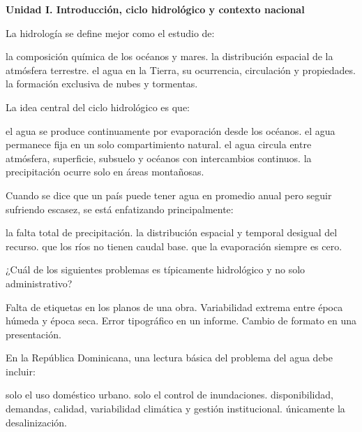 \item[]\textbf{Unidad I. Introducción, ciclo hidrológico y contexto nacional}\par\medskip

\question [2] La hidrología se define mejor como el estudio de:
\begin{choices}
\choice la composición química de los océanos y mares.
\choice la distribución espacial de la atmósfera terrestre.
\CorrectChoice el agua en la Tierra, su ocurrencia, circulación y propiedades.
\choice la formación exclusiva de nubes y tormentas.
\end{choices}

\question [2] La idea central del ciclo hidrológico es que:
\begin{choices}
\choice el agua se produce continuamente por evaporación desde los océanos.
\choice el agua permanece fija en un solo compartimiento natural.
\CorrectChoice el agua circula entre atmósfera, superficie, subsuelo y océanos con intercambios continuos.
\choice la precipitación ocurre solo en áreas montañosas.
\end{choices}

\question [3] Cuando se dice que un país puede tener agua en promedio anual pero seguir sufriendo escasez, se está enfatizando principalmente:
\begin{choices}
\choice la falta total de precipitación.
\CorrectChoice la distribución espacial y temporal desigual del recurso.
\choice que los ríos no tienen caudal base.
\choice que la evaporación siempre es cero.
\end{choices}

\question [3] ¿Cuál de los siguientes problemas es típicamente hidrológico y no solo administrativo?
\begin{choices}
\choice Falta de etiquetas en los planos de una obra.
\CorrectChoice Variabilidad extrema entre época húmeda y época seca.
\choice Error tipográfico en un informe.
\choice Cambio de formato en una presentación.
\end{choices}

\question [3] En la República Dominicana, una lectura básica del problema del agua debe incluir:
\begin{choices}
\choice solo el uso doméstico urbano.
\choice solo el control de inundaciones.
\CorrectChoice disponibilidad, demandas, calidad, variabilidad climática y gestión institucional.
\choice únicamente la desalinización.
\end{choices}

